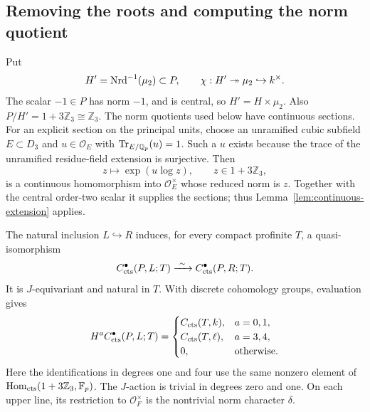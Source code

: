 \subsection{Removing the roots and computing the norm quotient}

Put
\[
 H'=\operatorname{Nrd}^{-1}(\mu_2)\subset P,\qquad
 \chi:H'\twoheadrightarrow\mu_2\hookrightarrow k^\times .
\]
The scalar $-1\in P$ has norm $-1$, and is central, so
$H'=H\times\mu_2$.  Also $P/H'=1+3\mathbb Z_3\cong\mathbb Z_3$.
The norm quotients used below have continuous sections.
For an explicit section on the principal units, choose an
unramified cubic subfield $E\subset D_3$ and
$u\in\mathcal O_E$ with $\operatorname{Tr}_{E/\mathbb Q_p}(u)=1$.
Such a $u$ exists because the trace of the unramified
residue-field extension is surjective.  Then
\[
 z\longmapsto \exp(u\log z),\qquad z\in1+3\mathbb Z_3,
\]
is a continuous homomorphism into $\mathcal O_E^\times$
whose reduced norm is $z$.  Together with the central
order-two scalar it supplies the sections; thus
Lemma~\ref{lem:continuous-extension} applies.

\begin{theorem}
\label{thm:coefficient-calculation}
The natural inclusion $L\hookrightarrow R$ induces, for
every compact profinite $T$, a quasi-isomorphism
\begin{equation}
 \label{eq:ordinary-perfect-P-comparison}
 C^\bullet_{\mathrm{cts}}(P,L;T)\xrightarrow{\ \sim\ }C^\bullet_{\mathrm{cts}}(P,R;T).
\end{equation}
It is $J$-equivariant and natural in $T$.  With discrete
cohomology groups, evaluation gives
\begin{equation}
 \label{eq:ordinary-four-rows}
 H^aC^\bullet_{\mathrm{cts}}(P,L;T)=
 \begin{cases}
 C_{\mathrm{cts}}(T,k),&a=0,1,\\
 C_{\mathrm{cts}}(T,\ell),&a=3,4,\\
 0,&\text{otherwise}.
 \end{cases}
\end{equation}
Here the identifications in degrees one and four use the same nonzero
element of $\operatorname{Hom}_{\mathrm{cts}}(1+3\mathbb Z_3,\mathbb F_p)$.
The $J$-action is trivial in degrees zero and one.
On each upper line, its restriction to
$\mathcal O_F^\times$ is the nontrivial norm character
$\delta$.
\end{theorem}

